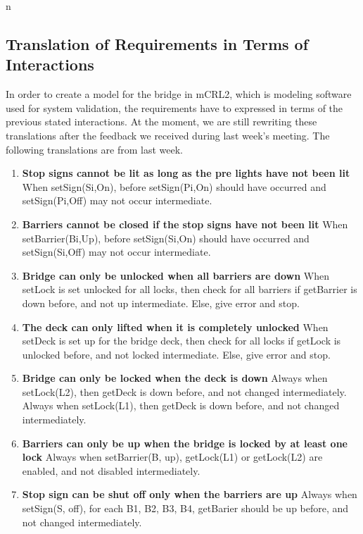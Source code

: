n\subsection{Translation of Requirements in Terms of Interactions}

In order to create a model for the bridge in mCRL2, which is modeling software used for system validation, the requirements have to expressed in terms of the previous stated interactions. At the moment, we are still rewriting these translations after the feedback we received during last week's meeting. The following translations are from last week.

\begin{enumerate}
	\item \textbf{Stop signs cannot be lit as long as the pre lights have not been lit}
	When setSign(Si,On), before setSign(Pi,On) should have occurred and setSign(Pi,Off) may not occur intermediate.

	\item \textbf{Barriers cannot be closed if the stop signs have not been lit}
	When setBarrier(Bi,Up), before setSign(Si,On) should have occurred and setSign(Si,Off) may not occur intermediate.

	\item \textbf{Bridge can only be unlocked when all barriers are down}
	When setLock is set unlocked for all locks, then check for all barriers if getBarrier is down before, and not up intermediate.
	Else, give error and stop.

	\item	\textbf{The deck can only lifted when it is completely unlocked}
	When setDeck is set up for the bridge deck, then check for all locks if getLock is unlocked before, and not locked intermediate.
	Else, give error and stop.

	\item \textbf{Bridge can only be locked when the deck is down}
	Always when setLock(L2), then getDeck is down before, and not changed intermediately.
	Always when setLock(L1), then getDeck is down before, and not changed intermediately.

	\item \textbf{Barriers can only be up when the bridge is locked by at least one lock}
	Always when setBarrier(B, up), getLock(L1) or getLock(L2) are enabled, and not disabled intermediately.

	\item \textbf{Stop sign can be shut off only when the barriers are up}
	Always when setSign(S, off), for each B1, B2, B3, B4, getBarier should be up before, and not changed intermediately.


\end{enumerate}
